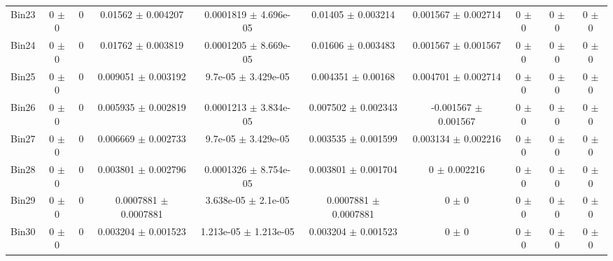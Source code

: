 \begin{tabular}{@{\extracolsep{4pt}}lccccccccc@{}}
     Bin23 & 0 $\pm$ 0 & 0 & 0.01562 $\pm$ 0.004207 & 0.0001819 $\pm$ 4.696e-05 & 0.01405 $\pm$ 0.003214 & 0.001567 $\pm$ 0.002714 & 0 $\pm$ 0 & 0 $\pm$ 0 & 0 $\pm$ 0 \\ 
     Bin24 & 0 $\pm$ 0 & 0 & 0.01762 $\pm$ 0.003819 & 0.0001205 $\pm$ 8.669e-05 & 0.01606 $\pm$ 0.003483 & 0.001567 $\pm$ 0.001567 & 0 $\pm$ 0 & 0 $\pm$ 0 & 0 $\pm$ 0 \\ 
     Bin25 & 0 $\pm$ 0 & 0 & 0.009051 $\pm$ 0.003192 & 9.7e-05 $\pm$ 3.429e-05 & 0.004351 $\pm$ 0.00168 & 0.004701 $\pm$ 0.002714 & 0 $\pm$ 0 & 0 $\pm$ 0 & 0 $\pm$ 0 \\ 
     Bin26 & 0 $\pm$ 0 & 0 & 0.005935 $\pm$ 0.002819 & 0.0001213 $\pm$ 3.834e-05 & 0.007502 $\pm$ 0.002343 & -0.001567 $\pm$ 0.001567 & 0 $\pm$ 0 & 0 $\pm$ 0 & 0 $\pm$ 0 \\ 
     Bin27 & 0 $\pm$ 0 & 0 & 0.006669 $\pm$ 0.002733 & 9.7e-05 $\pm$ 3.429e-05 & 0.003535 $\pm$ 0.001599 & 0.003134 $\pm$ 0.002216 & 0 $\pm$ 0 & 0 $\pm$ 0 & 0 $\pm$ 0 \\ 
     Bin28 & 0 $\pm$ 0 & 0 & 0.003801 $\pm$ 0.002796 & 0.0001326 $\pm$ 8.754e-05 & 0.003801 $\pm$ 0.001704 & 0 $\pm$ 0.002216 & 0 $\pm$ 0 & 0 $\pm$ 0 & 0 $\pm$ 0 \\ 
     Bin29 & 0 $\pm$ 0 & 0 & 0.0007881 $\pm$ 0.0007881 & 3.638e-05 $\pm$ 2.1e-05 & 0.0007881 $\pm$ 0.0007881 & 0 $\pm$ 0 & 0 $\pm$ 0 & 0 $\pm$ 0 & 0 $\pm$ 0 \\ 
     Bin30 & 0 $\pm$ 0 & 0 & 0.003204 $\pm$ 0.001523 & 1.213e-05 $\pm$ 1.213e-05 & 0.003204 $\pm$ 0.001523 & 0 $\pm$ 0 & 0 $\pm$ 0 & 0 $\pm$ 0 & 0 $\pm$ 0 \\ 
\hline\hline
  \end{tabular}
